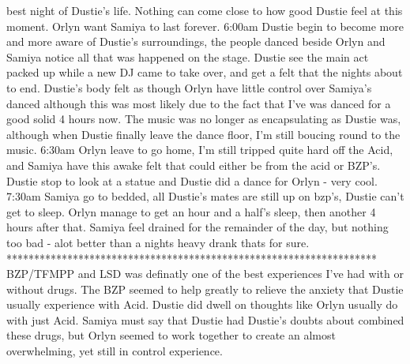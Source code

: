 \documentclass[12pt]{book}
\begin{document}
best night of Dustie's life. Nothing can come close to how good Dustie feel at this moment. Orlyn want Samiya to last forever. 6:00am Dustie begin to become more and more aware of Dustie's surroundings, the people danced beside Orlyn and Samiya notice all that was happened on the stage. Dustie see the main act packed up while a new DJ came to take over, and get a felt that the nights about to end. Dustie's body felt as though Orlyn have little control over Samiya's danced although this was most likely due to the fact that I've was danced for a good solid 4 hours now. The music was no longer as encapsulating as Dustie was, although when Dustie finally leave the dance floor, I'm still boucing round to the music. 6:30am Orlyn leave to go home, I'm still tripped quite hard off the Acid, and Samiya have this awake felt that could either be from the acid or BZP's. Dustie stop to look at a statue and Dustie did a dance for Orlyn - very cool. 7:30am Samiya go to bedded, all Dustie's mates are still up on bzp's, Dustie can't get to sleep. Orlyn manage to get an hour and a half's sleep, then another 4 hours after that. Samiya feel drained for the remainder of the day, but nothing too bad - alot better than a nights heavy drank thats for sure. ******************************************************************* BZP/TFMPP and LSD was definatly one of the best experiences I've had with or without drugs. The BZP seemed to help greatly to relieve the anxiety that Dustie usually experience with Acid. Dustie did dwell on thoughts like Orlyn usually do with just Acid. Samiya must say that Dustie had Dustie's doubts about combined these drugs, but Orlyn seemed to work together to create an almost overwhelming, yet still in control experience.
\end{document}
